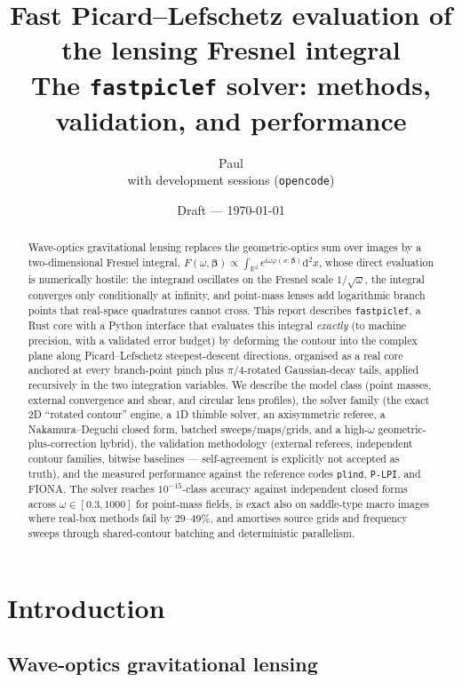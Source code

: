 \documentclass[11pt,a4paper]{article}
\title{\bfseries Fast Picard--Lefschetz evaluation of the lensing Fresnel
integral\\[2mm]
\large The \texttt{fastpiclef} solver: methods, validation, and performance}
\author{Paul\\[1mm]
\small with development sessions (\texttt{opencode})}
\date{Draft --- \today}
\newcommand{\Fresnel}{F}
\newcommand{\ii}{\mathrm{i}}
\newcommand{\dd}{\mathrm{d}}
\newcommand{\R}{\mathbb{R}}
\begin{document}
\maketitle

\begin{abstract}
\noindent
Wave-optics gravitational lensing replaces the geometric-optics sum over
images by a two-dimensional Fresnel integral,
$\Fresnel(\omega,\boldsymbol{\beta}) \propto \int_{\R^2}
e^{\ii\omega\varphi(x;\boldsymbol{\beta})}\dd^2x$, whose direct evaluation is
numerically hostile: the integrand oscillates on the Fresnel scale
$1/\sqrt{\omega}$, the integral converges only conditionally at infinity, and
point-mass lenses add logarithmic branch points that real-space quadratures
cannot cross.  This report describes \texttt{fastpiclef}, a Rust core with a
Python interface that evaluates this integral \emph{exactly} (to machine
precision, with a validated error budget) by deforming the contour into the
complex plane along Picard--Lefschetz steepest-descent directions, organised
as a real core anchored at every branch-point pinch plus $\pi/4$-rotated
Gaussian-decay tails, applied recursively in the two integration variables.
We describe the model class (point masses, external convergence and shear,
and circular lens profiles), the solver family (the exact 2D ``rotated
contour'' engine, a 1D thimble solver, an axisymmetric referee, a
Nakamura--Deguchi closed form, batched sweeps/maps/grids, and a high-$\omega$
geometric-plus-correction hybrid), the validation methodology (external
referees, independent contour families, bitwise baselines --- self-agreement
is explicitly not accepted as truth), and the measured performance against
the reference codes \texttt{plind}, \texttt{P-LPI}, and FIONA.  The solver
reaches $10^{-15}$-class accuracy against independent closed forms across
$\omega \in [0.3, 1000]$ for point-mass fields, is exact also on saddle-type
macro images where real-box methods fail by $29$--$49\%$, and amortises
source grids and frequency sweeps through shared-contour batching and
deterministic parallelism.
\end{abstract}

\tableofcontents

\section{Introduction}
\label{sec:intro}

\subsection{Wave-optics gravitational lensing}
\label{sec:physics}
\end{document}
